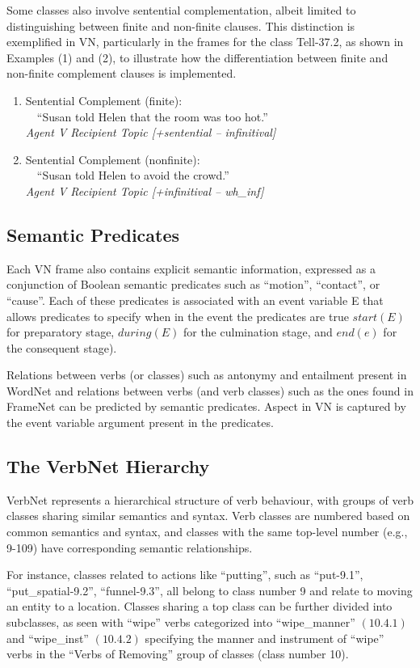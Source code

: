 Some classes also involve sentential complementation, albeit limited to distinguishing between finite and non-finite clauses. This distinction is exemplified in VN, particularly in the frames for the class Tell-37.2, as shown in Examples (1) and (2), to illustrate how the differentiation between finite and non-finite complement clauses is implemented.
\begin{enumerate}
\item Sentential Complement (ﬁnite): \\ \ \ \enquote{Susan told Helen that the room was too hot.} \\ \emph{Agent V Recipient Topic [+sentential – infinitival]}
\item Sentential Complement (nonﬁnite): \\ \ \  \enquote{Susan told Helen to avoid the crowd.}\\ \emph{Agent V Recipient Topic [+inﬁnitival – wh\_inf]}
\end{enumerate}
\subsection*{Semantic Predicates}
Each VN frame also contains explicit semantic information, expressed as a conjunction of Boolean semantic predicates such as \enquote{motion}, \enquote{contact}, or \enquote{cause}. Each of these predicates is associated with an event variable E that allows predicates to specify when in the event the predicates are true $start(E)$ for preparatory stage, $during(E)$ for the culmination stage, and $end(e)$ for the consequent stage). 

Relations between verbs (or classes) such as antonymy and entailment present in WordNet and relations between verbs (and verb classes) such as the ones found in FrameNet can be predicted by semantic predicates. Aspect in VN is captured by the event variable argument present in the predicates.
\subsection*{The VerbNet Hierarchy}
VerbNet represents a hierarchical structure of verb behaviour, with groups of verb classes sharing similar semantics and syntax. Verb classes are numbered based on common semantics and syntax, and classes with the same top-level number (e.g., 9-109) have corresponding semantic relationships. 

For instance, classes related to actions like \enquote{putting}, such as \enquote{put-9.1}, \enquote{put\_spatial-9.2}, \enquote{funnel-9.3}, all belong to class number 9 and relate to moving an entity to a location. Classes sharing a top class can be further divided into subclasses, as seen with \enquote{wipe} verbs categorized into \enquote{wipe\_manner} $(10.4.1)$ and \enquote{wipe\_inst} $(10.4.2)$ specifying the manner and instrument of \enquote{wipe} verbs in the \enquote{Verbs of Removing} group of classes (class number 10).

